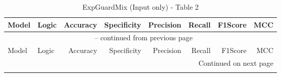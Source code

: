 \documentclass{article}
\begin{document}

{\small
\begin{longtable}{llrrrrrr}
\caption{ExpGuardMix (Input only) - Table 2} \label{tab:5models} \\
 
\toprule
Model & Logic & Accuracy & Specificity & Precision & Recall & F1Score & MCC \\
\midrule
\endfirsthead
 
\multicolumn{8}{c}{\tablename\ \thetable{} -- continued from previous page} \\
\toprule
Model & Logic & Accuracy & Specificity & Precision & Recall & F1Score & MCC \\
\midrule
\endhead
 
\midrule
\multicolumn{8}{r}{Continued on next page} \\
\endfoot
 
\bottomrule
\endlastfoot


\end{longtable}}
\end{document}
